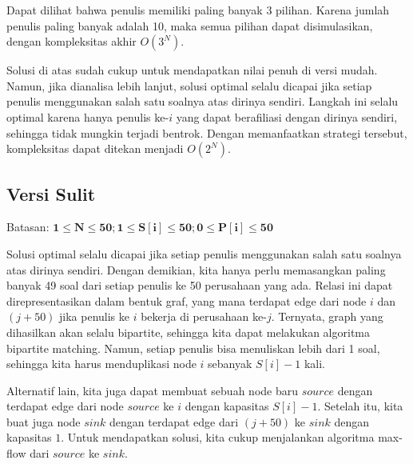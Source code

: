 \documentclass[../main_editorial.tex]{subfiles} %
\begin{document}
Dapat dilihat bahwa penulis memiliki paling banyak 3 pilihan. Karena jumlah penulis paling banyak adalah 10, maka semua pilihan dapat disimulasikan, dengan kompleksitas akhir $O(3^N)$. 

Solusi di atas sudah cukup untuk mendapatkan nilai penuh di versi mudah. Namun, jika dianalisa lebih lanjut, solusi optimal selalu dicapai jika setiap penulis menggunakan salah satu soalnya atas dirinya sendiri. Langkah ini selalu optimal karena hanya penulis ke-$i$ yang dapat berafiliasi dengan dirinya sendiri, sehingga tidak mungkin terjadi bentrok. Dengan memanfaatkan strategi tersebut, kompleksitas dapat ditekan menjadi $O(2^N)$.


\subsection*{Versi Sulit}

Batasan:
$\mathbf{1 \le N \le 50; 1 \le S[i] \le 50; 0 \le P[i] \le 50}$

Solusi optimal selalu dicapai jika setiap penulis menggunakan salah satu soalnya atas dirinya sendiri. Dengan demikian, kita hanya perlu memasangkan paling banyak 49 soal dari setiap penulis ke 50 perusahaan yang ada. Relasi ini dapat direpresentasikan dalam bentuk graf, yang mana terdapat edge dari node $i$ dan $(j+50)$ jika penulis ke $i$ bekerja di perusahaan ke-$j$. Ternyata, graph yang dihasilkan akan selalu bipartite, sehingga kita dapat melakukan algoritma bipartite matching. Namun, setiap penulis bisa menuliskan lebih dari 1 soal, sehingga kita harus menduplikasi node $i$ sebanyak $S[i]-1$ kali. 

Alternatif lain, kita juga dapat membuat sebuah node baru $source$ dengan terdapat edge dari node $source$ ke $i$ dengan kapasitas $S[i] - 1$. Setelah itu, kita buat juga node $sink$ dengan terdapat edge dari $(j+50)$ ke $sink$ dengan kapasitas $1$. Untuk mendapatkan solusi, kita cukup menjalankan algoritma max-flow dari $source$ ke $sink$.
\end{document}
